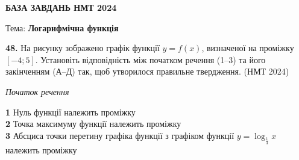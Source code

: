 \documentclass[14pt]{extarticle}
\newcommand{\nmtyear}[1]{\hfill{\small\color{yearcolor}(НМТ #1)}}
\begin{document}
\vspace{0.7cm}





\newpage

\begin{center}
{\Large\textbf{\color{headerblue}БАЗА ЗАВДАНЬ НМТ 2024}}
\end{center}

\begin{center}
{\large Тема: \textbf{Логарифмічна функція}}
\end{center}

\vspace{0.5cm}


\noindent\textbf{48.} На рисунку зображено графік функції $y=f(x)$, визначеної на проміжку $[-4; 5]$. Установіть відповідність між початком речення (1--3) та його закінченням (А--Д) так, щоб утворилося правильне твердження. \nmtyear{2024}

\vspace{0.3cm}

\noindent
\begin{minipage}[t]{0.55\textwidth}
    \textit{Початок речення} \par \vspace{0.3cm}
    \textbf{1} \quad Нуль функції належить проміжку \\[0.4cm]
    \textbf{2} \quad Точка максимуму функції належить проміжку \\[0.4cm]
    \textbf{3} \quad Абсциса точки перетину графіка функції з графіком функції $y = \log_{\frac{1}{3}} x$ належить проміжку
\end{minipage}%
\hfill
\begin{minipage}[t]{0.40\textwidth}
    \vspace{-0.5cm}
    \begin{flushright}
    \end{flushright}
\end{minipage}
\end{document}
